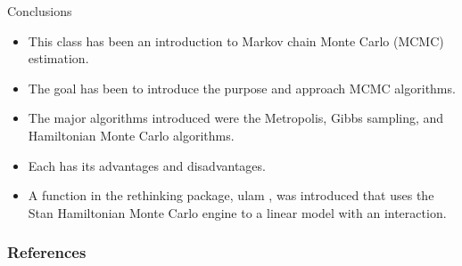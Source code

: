 \documentclass[handout]{beamer}
\begin{document}
\begin{frame}{Conclusions}
\scriptsize{

\begin{itemize}
\item This class has been an  introduction to Markov chain Monte Carlo (MCMC) estimation. 

\item The goal has been to introduce the purpose and approach MCMC algorithms.
\item The major algorithms introduced were the Metropolis, Gibbs sampling, and Hamiltonian
Monte Carlo algorithms.
\item Each has its advantages and disadvantages. 
\item A function in the rethinking package, ulam , was introduced that uses the Stan Hamiltonian Monte Carlo engine to a linear model with an interaction.
\end{itemize}


} 
\end{frame}


\begin{frame}[allowframebreaks]\scriptsize
\frametitle{References}


%
\end{frame}  









\end{document}
